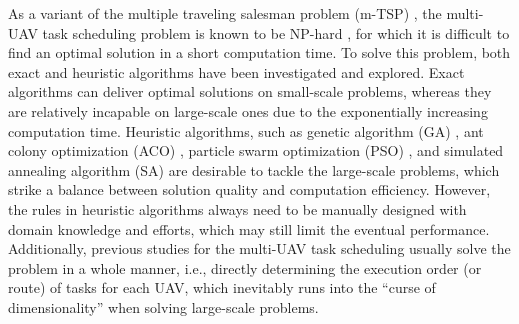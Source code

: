 \documentclass[lettersize,journal]{IEEEtran}
\begin{document}
	
	As a variant of the multiple traveling salesman problem (m-TSP) \cite{laporteCuttingPlanesAlgorithm1980}, the multi-UAV task scheduling problem is known to be NP-hard \cite{gerkeyFormalAnalysisTaxonomy2004}, for which it is difficult to find an optimal solution in a short computation time. To solve this problem, both exact and heuristic algorithms have been investigated and explored. Exact algorithms \cite{richardsCoordinationControlMultiple2002, alighanbariCooperativeTaskAssignment2005, forsmoOptimalSearchMission2013} can deliver optimal solutions on small-scale problems, whereas they are relatively incapable on large-scale ones due to the exponentially increasing computation time. Heuristic algorithms, such as genetic algorithm (GA) \cite{edisonIntegratedTaskAssignment2011}, ant colony optimization (ACO) \cite{gaoMultiUAVReconnaissanceTask2021}, particle swarm optimization (PSO) \cite{gengParticleSwarmOptimization2021}, and simulated annealing algorithm (SA) \cite{huoNovelSimulatedAnnealing2020} are desirable to tackle the large-scale problems, which strike a balance between solution quality and computation efficiency. However, the rules in heuristic algorithms always need to be manually designed with domain knowledge and efforts, which may still limit the eventual performance. Additionally, previous studies for the multi-UAV task scheduling usually solve the problem in a whole manner, i.e., directly determining the execution order (or route) of tasks for each UAV, which inevitably runs into the “curse of dimensionality” when solving large-scale problems.
	
\end{document}
